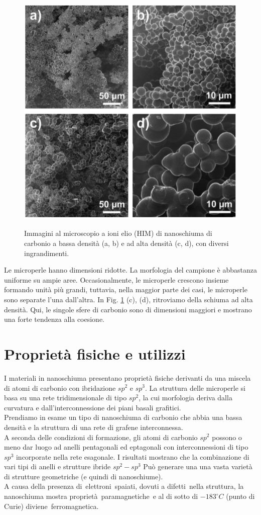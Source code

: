 \documentclass[a4paper,titlepage]{book}
\begin{document}
\begin{figure}[h!] 
	\centering \label{foam}
	\includegraphics[width=0.55\columnwidth]{nanofoam.png}
	\caption{ 	
		Immagini al microscopio a ioni elio (HIM) di nanoschiuma di carbonio a bassa densità (a, b) e ad alta densità (c, d), con diversi ingrandimenti.}
\end{figure}
Le microperle hanno dimensioni ridotte. La morfologia del campione è abbastanza uniforme su ampie aree. Occasionalmente, le microperle crescono insieme formando unità più grandi, tuttavia, nella maggior parte dei casi, le microperle sono separate l'una dall'altra. In Fig. \ref{foam} (c), (d), ritroviamo della schiuma ad alta densità. Qui, le singole sfere di carbonio sono di dimensioni maggiori e mostrano una forte tendenza alla coesione.  
\section{Proprietà fisiche e utilizzi}
I materiali in nanoschiuma presentano proprietà fisiche derivanti da una miscela di atomi di carbonio con ibridazione $sp^2$ e $sp^3$. La struttura delle microperle si basa su una rete tridimensionale di tipo $sp^2$, la cui morfologia deriva dalla curvatura e dall'interconnessione dei piani basali grafitici.\\
Prendiamo in esame un tipo di nanoschiuma di carbonio che abbia una bassa densità e la struttura di una rete di grafene interconnessa.\\
A seconda delle condizioni di formazione, gli atomi di carbonio $sp^2$ possono o meno dar luogo ad anelli pentagonali ed eptagonali con interconnessioni di tipo $sp^3$ incorporate nella rete esagonale. I risultati mostrano che la combinazione di vari tipi di anelli e strutture ibride $sp^2-sp^3$ Può generare una una vasta varietà di strutture geometriche (e quindi di nanoschiume).\\
A causa della presenza di elettroni spaiati, dovuti a difetti nella struttura, la nanoschiuma mostra proprietà paramagnetiche e al di sotto di $-183 ^\circ C$ (punto di Curie) diviene ferromagnetica. \\
\end{document}
